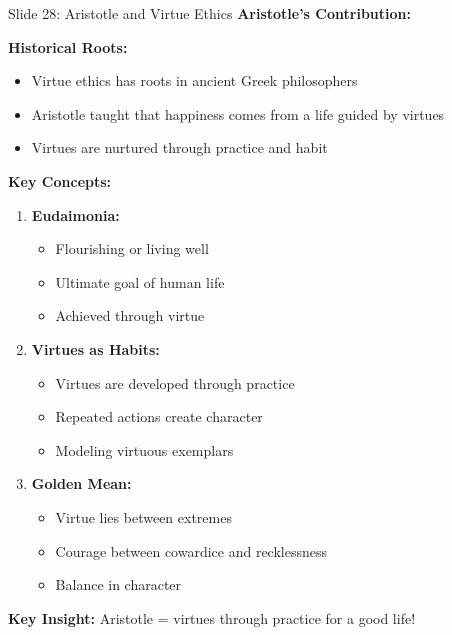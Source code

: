 \documentclass[8pt]{beamer}
\begin{document}
	\begin{frame}{Slide 28: Aristotle and Virtue Ethics}
		\fontsize{6.5}{7.5}\selectfont
		\textbf{Aristotle's Contribution:}
		
		\vspace{0.1cm}
		\textbf{Historical Roots:}
		\begin{itemize}
			\item Virtue ethics has roots in ancient Greek philosophers
			\item Aristotle taught that happiness comes from a life guided by virtues
			\item Virtues are nurtured through practice and habit
		\end{itemize}
		
		\vspace{0.1cm}
		\textbf{Key Concepts:}
		\begin{enumerate}
			\item \textbf{Eudaimonia:}
			\begin{itemize}
				\item Flourishing or living well
				\item Ultimate goal of human life
				\item Achieved through virtue
			\end{itemize}
			\item \textbf{Virtues as Habits:}
			\begin{itemize}
				\item Virtues are developed through practice
				\item Repeated actions create character
				\item Modeling virtuous exemplars
			\end{itemize}
			\item \textbf{Golden Mean:}
			\begin{itemize}
				\item Virtue lies between extremes
				\item Courage between cowardice and recklessness
				\item Balance in character
			\end{itemize}
		\end{enumerate}
		
		\textcolor{myblue}{\textbf{Key Insight:}} Aristotle = \textcolor{myblue}{virtues through practice for a good life}!
	\end{frame}
	
\end{document}
